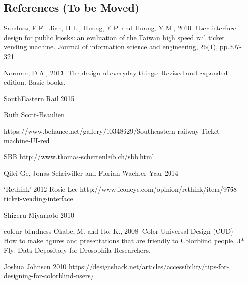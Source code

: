 \subsection{References (To be Moved)}
Sandnes, F.E., Jian, H.L., Huang, Y.P. and Huang, Y.M., 2010. User interface design for public kiosks: an evaluation of the Taiwan high speed rail ticket vending machine. Journal of information science and engineering, 26(1), pp.307-321. 

Norman, D.A., 2013. The design of everyday things: Revised and expanded edition. Basic books.


SouthEastern Rail 2015

Ruth Scott-Beaulieu

https://www.behance.net/gallery/10348629/Southeastern-railway-Ticket-machine-UI-red


SBB
http://www.thomas-schertenleib.ch/sbb.html

Qilei Ge, Jonas Scheiwiller and Florian Wachter
Year
2014


‘Rethink’ 2012 Rosie Lee
http://www.iconeye.com/opinion/rethink/item/9768-ticket-vending-interface 


Shigeru Miyamoto 2010


colour blindness
Okabe, M. and Ito, K., 2008. Color Universal Design (CUD)-How to make figures and presentations that are friendly to Colorblind people. J* Fly: Data Depository for Drosophila Researchers.


Joshua Johnson 2010
https://designshack.net/articles/accessibility/tips-for-designing-for-colorblind-users/
